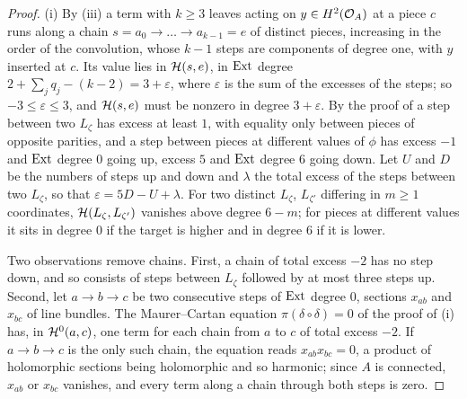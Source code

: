 \begin{proof}
(i) By (iii) a term with $k\ge3$ leaves acting on
$y\in H^{2}(\mathcal{O}_{A})$ at a piece $c$ runs along a chain
$s=a_{0}\to\dots\to a_{k-1}=e$ of distinct pieces, increasing in the order
of the convolution, whose $k-1$ steps are components of degree one, with $y$
inserted at $c$. Its value lies in $\mathcal{H}(s,e)$, in $\operatorname{Ext}$ degree
$2+\sum_{j}q_{j}-(k-2)=3+\varepsilon$, where $\varepsilon$ is the sum of the
excesses of the steps; so $-3\le\varepsilon\le3$, and $\mathcal{H}(s,e)$ must be
nonzero in degree $3+\varepsilon$. By the proof of 
a step between two $L_{\zeta}$ has excess at least $1$, with equality only
between pieces of opposite parities, and a step between pieces at different
values of $\phi$ has excess $-1$ and $\operatorname{Ext}$ degree $0$ going up, excess $5$
and $\operatorname{Ext}$ degree $6$ going down. Let $U$ and $D$ be the numbers of steps
up and down and $\lambda$ the total excess of the steps between two
$L_{\zeta}$, so that $\varepsilon=5D-U+\lambda$. For two distinct
$L_{\zeta}$, $L_{\zeta'}$ differing in $m\ge1$ coordinates, $\mathcal{H}(L_{\zeta},
L_{\zeta'})$ vanishes above degree $6-m$; for pieces at different values it
sits in degree $0$ if the target is higher and in degree $6$ if it is lower.

Two observations remove chains. First, a chain of total excess $-2$ has no
step down, and so consists of steps between $L_{\zeta}$ followed by at most
three steps up. Second, let $a\to b\to c$ be two consecutive steps of
$\operatorname{Ext}$ degree $0$, sections $x_{ab}$ and $x_{bc}$ of line bundles. The
Maurer--Cartan equation $\pi(\delta\circ\delta)=0$ of the proof of
(i) has, in $\mathcal{H}^{0}(a,c)$, one term for each
chain from $a$ to $c$ of total excess $-2$. If $a\to b\to c$ is the only such
chain, the equation reads $x_{ab}x_{bc}=0$, a product of holomorphic
sections being holomorphic and so harmonic; since $A$ is connected, $x_{ab}$
or $x_{bc}$ vanishes, and every term along a chain through both steps is
zero.


\end{proof}
